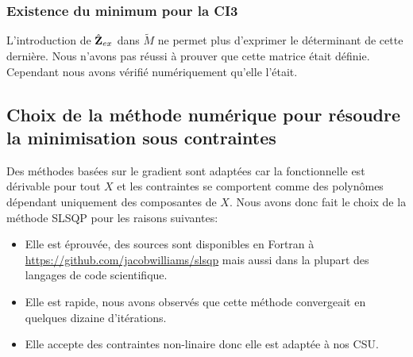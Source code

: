 \subsubsection{Existence du minimum pour la CI3}

  L'introduction de \(\hat{\mathbf{Z}}_{ex}\) dans \(\tilde M\) ne permet plus d'exprimer le déterminant de cette dernière. Nous n'avons pas réussi à prouver que cette matrice était définie. Cependant nous avons vérifié numériquement qu'elle l'était.


\subsection{Choix de la méthode numérique pour résoudre la minimisation sous contraintes}

  Des méthodes basées sur le gradient sont adaptées car la fonctionnelle est dérivable pour tout \(X\) et les contraintes se comportent comme des polynômes dépendant uniquement des composantes de \(X\). Nous avons donc fait le choix de la méthode SLSQP pour les raisons suivantes:
 
  \begin{itemize}
    \item Elle est éprouvée, des sources sont disponibles en Fortran à \url{https://github.com/jacobwilliams/slsqp} mais aussi dans la plupart des langages de code scientifique.
    \item Elle est rapide, nous avons observés que cette méthode convergeait en quelques dizaine d'itérations.
    \item Elle accepte des contraintes non-linaire donc elle est adaptée à nos CSU.
  \end{itemize}